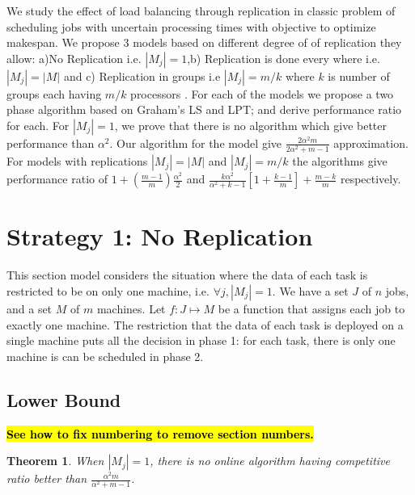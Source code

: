 \documentclass[10pt, conference, compsocconf]{IEEEtran}
\newtheorem{theorem}{Theorem}[section]
\newcommand{\todo}[1]{{\color{red}\textbf{\hl{#1}}\xspace}}
\begin{document}
We study the effect of load balancing through replication in classic
problem of scheduling jobs with uncertain processing times with
objective to optimize makespan. We propose 3 models based on different
degree of of replication they allow: a)No Replication i.e. $|M_j|=1
$,b) Replication is done every where i.e.$|M_j|=|M|$ and c)
Replication in groups i.e $|M_j|= m/k$ where $k$ is number of groups
each having $m/k$ processors . For each of the models we propose a two
phase algorithm based on Graham's LS and LPT; and derive performance
ratio for each. For $|M_j|=1 $, we prove that there is no algorithm
which give better performance than $\alpha^2$. Our algorithm for the
model give $\frac{2\alpha^{2}m}{2\alpha^{2}+ m-1}$ approximation. For
models with replications $|M_j|=|M|$ and $|M_j|= m/k$ the algorithms
give performance ratio of $ 1 + (\frac{m-1}{m})\frac{\alpha^{2}}{2}$
and $\frac{k\alpha^{2}}{\alpha^{2}+k-1}\left[1+ {\frac{k-1}{m}}
\right]+ {\frac{m-k}{m}}$ respectively.

\section{Strategy 1: No Replication}\label{sec4}


This section model considers the situation where the data of each task
is restricted to be on only one machine, i.e. $\forall j, |M_j|=1$.
We have a set $J$ of $ n$ jobs, and a set $M$ of $m$ machines.  Let $f
: J \mapsto M$ be a function that assigns each job to exactly one
machine. The restriction that the data of each task is deployed on a
single machine puts all the decision in phase 1: for each task,
there is only one machine is can be scheduled in phase 2.

\subsection{Lower Bound}

\todo{See how to fix numbering to remove section numbers.}
\begin{theorem}
\label{th:model1-lb}
  When $|M_j| = 1$, there is no online algorithm having competitive
  ratio better than $\frac{\alpha^{2}m }{\alpha^{2} + m-1}$.
\end{theorem}
 
\end{document}
